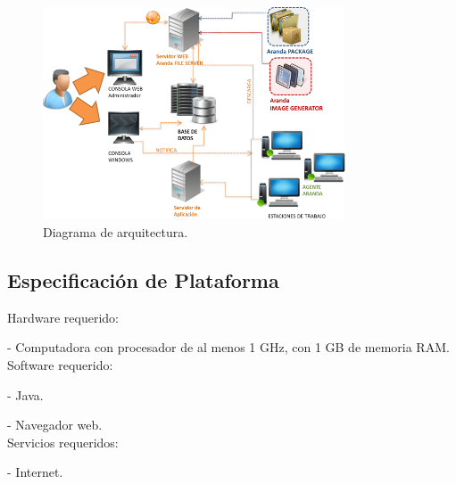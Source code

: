 	\begin{figure}[htbp!]
		\centering
			\includegraphics[width=0.8\textwidth]{images/arquitectura4}
		\caption{Diagrama de arquitectura.}
	\end{figure}


\subsection{Especificación de Plataforma}

Hardware requerido:

- Computadora con procesador de al menos 1 GHz, con 1 GB de memoria RAM. \\

Software requerido:

- Java.

- Navegador web. \\

Servicios requeridos:

- Internet. \\

